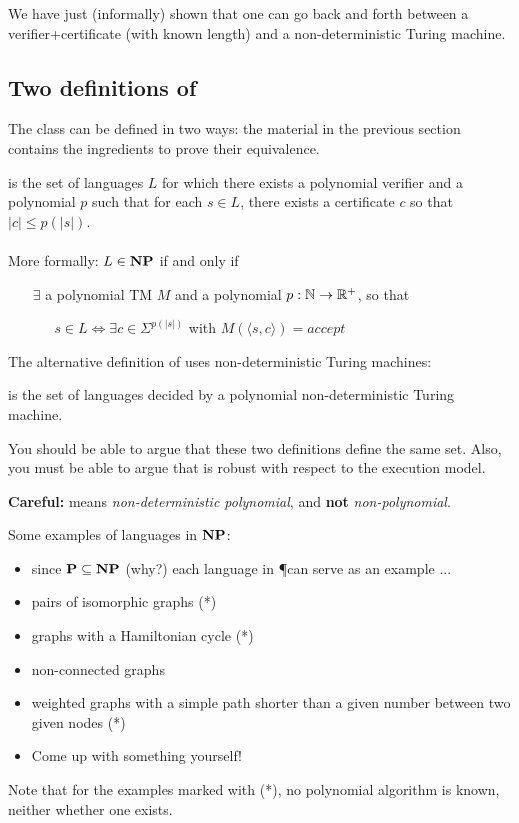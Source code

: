 We have just (informally) shown that one can go back and forth between
a verifier+certificate (with known length) and a non-deterministic
Turing machine.



\subsection{Two definitions of \NP}

The class \NP can be defined in two ways: the material in the previous
section contains the ingredients to prove their equivalence.

\begin{definition}
\NP is the set of languages $L$ for which there exists a polynomial
verifier and a polynomial $p$ such that for each $s \in L$, there
exists a certificate $c$ so that $|c| \leq p(|s|)$.  ~\\ ~\\
More formally: $L \in {\bf NP}$ if and only if

$~~~~~~~~\exists$ a polynomial TM $M$ and a polynomial $p: \mathbb{N}
\rightarrow \mathbb{R}^+$, so that

$~~~~~~~~~~~~~~~s \in L  \Leftrightarrow  \exists c \in \Sigma^{p(|s|)}$ with $M(\langle s,c \rangle) = accept$
\end{definition}

The alternative definition of \NP uses non-deterministic Turing machines:

\begin{definition}
\NP is the set of languages decided by a polynomial non-deterministic
Turing machine.
\end{definition}

You should be able to argue that these two definitions define the same
set. Also, you must be able to argue that \NP is robust with respect
to the execution model.

{\bf Careful:} \NP means {\em non-deterministic polynomial},
and {\bf not} {\em non-polynomial}.

\begin{example}
Some examples of languages in ${\bf NP}$:

\begin{itemize}
\item
since ${\bf P} \subseteq {\bf NP}$ (why?) each language in \P can serve as an example ...
\item
pairs of isomorphic graphs (*)
\item
graphs with a Hamiltonian cycle (*)
\item
non-connected graphs
\item
weighted graphs with a simple path shorter than
a given number between two given nodes (*)
\item
Come up with something yourself!
\end{itemize}
Note that for the examples marked with (*), no polynomial
algorithm is known, neither whether one exists.
\end{example}

